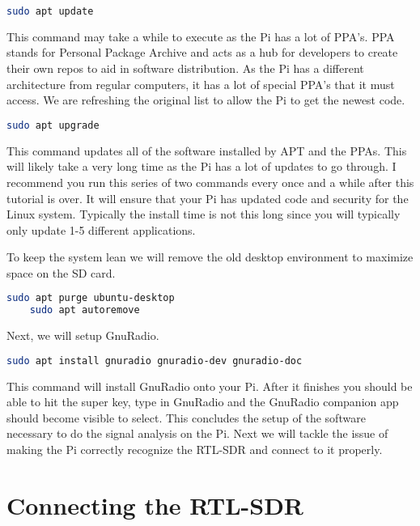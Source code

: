 \documentclass[letterpaper,12pt,notitlepage]{report} %
\begin{document}
\begin{lstlisting}[language=bash]
	sudo apt update
\end{lstlisting}

This command may take a while to execute as the Pi has a lot of PPA's. PPA stands for Personal Package Archive and acts as a hub for developers to create their own repos to aid in software distribution. As the Pi has a different architecture from regular computers, it has a lot of special PPA's that it must access. We are refreshing the original list to allow the Pi to get the newest code.

\begin{lstlisting}[language=bash]
	sudo apt upgrade
\end{lstlisting}

This command updates all of the software installed by APT and the PPAs. This will likely take a very long time as the Pi has a lot of updates to go through. I recommend you run this series of two commands every once and a while after this tutorial is over. It will ensure that your Pi has updated code and security for the Linux system. Typically the install time is not this long since you will typically only update 1-5 different applications. 

To keep the system lean we will remove the old desktop environment to maximize space on the SD card. 

\begin{lstlisting}[language=bash]
	sudo apt purge ubuntu-desktop
	sudo apt autoremove
\end{lstlisting}

Next, we will setup GnuRadio. 

\begin{lstlisting}[language=bash]
	sudo apt install gnuradio gnuradio-dev gnuradio-doc
\end{lstlisting}

This command will install GnuRadio onto your Pi. After it finishes you should be able to hit the super key, type in GnuRadio and the GnuRadio companion app should become visible to select. 
This concludes the setup of the software necessary to do the signal analysis on the Pi. Next we will tackle the issue of making the Pi correctly recognize the RTL-SDR and connect to it properly.

\section{Connecting the RTL-SDR}
\end{document}
